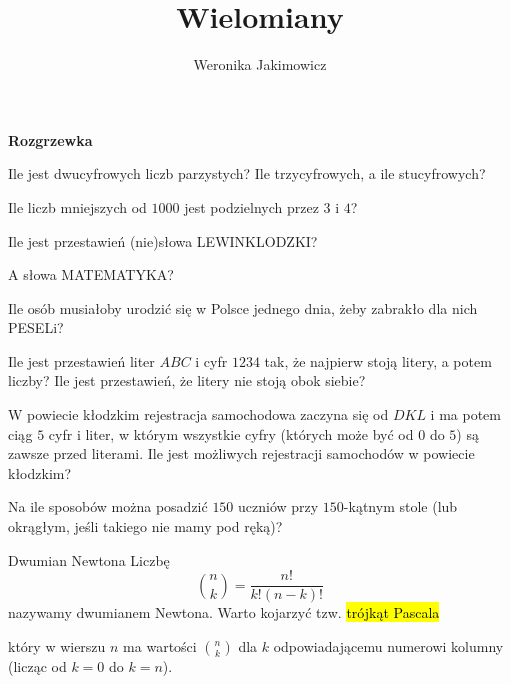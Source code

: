 \documentclass{article}
\title{Wielomiany}
\author{Weronika Jakimowicz}
\date{}
\begin{document}
\noindent\makebox[\linewidth]{\rule{\textwidth}{0.4pt}}

\textbf{\large Rozgrzewka}

\begin{zadanie}
  Ile jest dwucyfrowych liczb parzystych? Ile trzycyfrowych, a ile stucyfrowych?
\end{zadanie}

\begin{zadanie}
  Ile liczb  mniejszych od $1000$ jest podzielnych przez $3$ i $4$?
\end{zadanie}

\begin{zadanie}
  Ile jest przestawień (nie)słowa LEWINKLODZKI?
\end{zadanie}

\noindent\makebox[\linewidth]{\rule{\textwidth}{0.4pt}}

\begin{zadanie}
  A słowa MATEMATYKA?
\end{zadanie}

\begin{zadanie}
  Ile osób musiałoby urodzić się w Polsce jednego dnia, żeby zabrakło dla nich PESELi?
\end{zadanie}

\begin{zadanie}
  Ile jest przestawień liter $ABC$ i cyfr $1234$ tak, że najpierw stoją litery, a potem liczby? Ile jest przestawień, że litery nie stoją obok siebie?
\end{zadanie}

\begin{zadanie}
  W powiecie kłodzkim rejestracja samochodowa zaczyna się od $DKL$ i ma potem ciąg $5$ cyfr i liter, w którym wszystkie cyfry (których może być od $0$ do $5$) są zawsze przed literami. Ile jest możliwych rejestracji samochodów w powiecie kłodzkim?
\end{zadanie}

\begin{zadanie}
  Na ile sposobów można posadzić $150$ uczniów przy $150$-kątnym stole (lub okrągłym, jeśli takiego nie mamy pod ręką)?
\end{zadanie}

\begin{mybox}{Dwumian Newtona}
  Liczbę
  $$\binom{n}{k}=\frac{n!}{k!(n-k)!}$$
  nazywamy dwumianem Newtona. Warto kojarzyć tzw. \hl{trójkąt Pascala}
  \begin{center}
  \end{center}
  \medskip
  który w wierszu $n$ ma wartości $\binom{n}{k}$ dla $k$ odpowiadającemu numerowi kolumny (licząc od $k=0$ do $k=n$).
\end{mybox}
\end{document}
